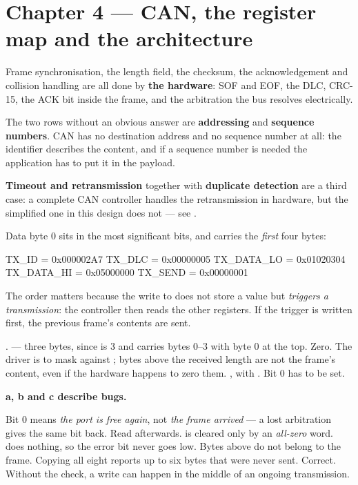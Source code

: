\section*{Chapter 4 --- CAN, the register map and the architecture}

Frame synchronisation, the length field, the checksum, the acknowledgement and collision handling
are all done by \textbf{the hardware}: SOF and EOF, the DLC, CRC-15, the ACK bit inside the frame,
and the arbitration the bus resolves electrically.

The two rows without an obvious answer are \textbf{addressing} and \textbf{sequence numbers}. CAN
has no destination address and no sequence number at all: the identifier describes the content,
and if a sequence number is needed the application has to put it in the payload.

\textbf{Timeout and retransmission} together with \textbf{duplicate detection} are a third case: a
complete CAN controller handles the retransmission in hardware, but the simplified one in this
design does not --- see .

Data byte 0 sits in the most significant bits, and  carries the \emph{first} four
bytes:

\begin{console}
TX_ID      = 0x000002A7
TX_DLC     = 0x00000005
TX_DATA_LO = 0x01020304
TX_DATA_HI = 0x05000000
TX_SEND    = 0x00000001
\end{console}

The order matters because the write to  does not store a value but \emph{triggers a
transmission}: the controller then reads the other registers. If the trigger is written first, the
previous frame's contents are sent.

 .
  --- three bytes, since  is 3 and  carries
bytes 0--3 with byte 0 at the top.
 Zero. The driver is to mask against ; bytes above the received length are not
the frame's content, even if the hardware happens to zero them.
 , with . Bit 0 has to be set.

\textbf{a, b and c describe bugs.}

 Bit 0 means \emph{the port is free again}, not \emph{the frame arrived} --- a lost
arbitration gives the same bit back. Read  afterwards.
  is cleared only by an \emph{all-zero} word.  does nothing, so
the error bit never goes low.
 Bytes above  do not belong to the frame. Copying all eight reports up to six
bytes that were never sent.
 Correct. Without the check, a write can happen in the middle of an ongoing transmission.

